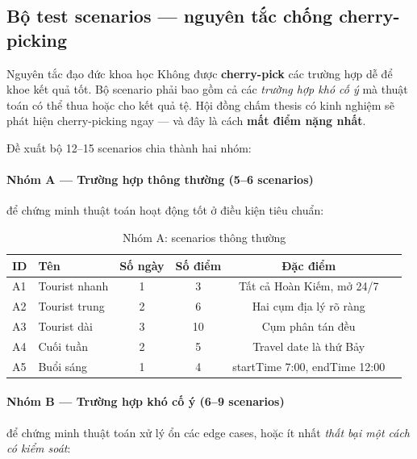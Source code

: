 \documentclass[12pt,a4paper]{report}
\begin{document}
\subsection{Bộ test scenarios --- nguyên tắc chống cherry-picking}

\begin{warningbox}{Nguyên tắc đạo đức khoa học}
Không được \textbf{cherry-pick} các trường hợp dễ để khoe kết quả tốt. Bộ scenario phải bao gồm cả các \textit{trường hợp khó cố ý} mà thuật toán có thể thua hoặc cho kết quả tệ. Hội đồng chấm thesis có kinh nghiệm sẽ phát hiện cherry-picking ngay --- và đây là cách \textbf{mất điểm nặng nhất}.
\end{warningbox}

Đề xuất bộ 12--15 scenarios chia thành hai nhóm:

\paragraph{Nhóm A --- Trường hợp thông thường (5--6 scenarios)} để chứng minh thuật toán hoạt động tốt ở điều kiện tiêu chuẩn:

\begin{table}[H]
\centering
\caption{Nhóm A: scenarios thông thường}
\begin{tabular}{llcccl}
\toprule
\textbf{ID} & \textbf{Tên} & \textbf{Số ngày} & \textbf{Số điểm} & \textbf{Đặc điểm} \\
\midrule
A1 & Tourist nhanh   & 1 & 3 & Tất cả Hoàn Kiếm, mở 24/7 \\
A2 & Tourist trung   & 2 & 6 & Hai cụm địa lý rõ ràng \\
A3 & Tourist dài     & 3 & 10 & Cụm phân tán đều \\
A4 & Cuối tuần       & 2 & 5 & Travel date là thứ Bảy \\
A5 & Buổi sáng       & 1 & 4 & startTime 7:00, endTime 12:00 \\
\bottomrule
\end{tabular}
\end{table}

\paragraph{Nhóm B --- Trường hợp khó cố ý (6--9 scenarios)} để chứng minh thuật toán xử lý ổn các edge cases, hoặc ít nhất \textit{thất bại một cách có kiểm soát}:
\end{document}
